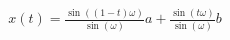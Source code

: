 \documentclass[preview]{standalone}
\begin{document}
\begin{align*}
x(t) = \frac{\sin((1-t)\omega)}{\sin(\omega)}a + \frac{\sin(t\omega)}{\sin(\omega)}b
\end{align*}
\end{document}
